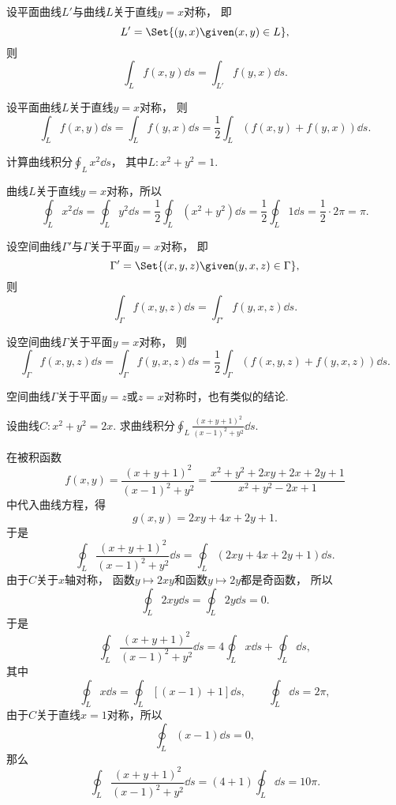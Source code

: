 
设平面曲线\(L'\)与曲线\(L\)关于直线\(y=x\)对称，
即\[
	L' = \Set{ (y,x) \given (x,y) \in L },
\]
则\[
	\int_L f(x,y) \dd{s}
	= \int_{L'} f(y,x) \dd{s}.
\]

设平面曲线\(L\)关于直线\(y=x\)对称，
则\[
	\int_L f(x,y) \dd{s}
	= \int_L f(y,x) \dd{s}
	= \frac12 \int_L (f(x,y) + f(y,x)) \dd{s}.
\]

\begin{example}
计算曲线积分\(\oint_L x^2 \dd{s}\)，
其中\(L: x^2+y^2=1\).
\begin{solution}
曲线\(L\)关于直线\(y=x\)对称，所以\[
	\oint_L x^2 \dd{s}
	= \oint_L y^2 \dd{s}
	= \frac12 \oint_L (x^2+y^2) \dd{s}
	= \frac12 \oint_L 1 \dd{s}
	= \frac12 \cdot 2\pi
	= \pi.
\]
\end{solution}
\end{example}

设空间曲线\(\Gamma'\)与\(\Gamma\)关于平面\(y=x\)对称，
即\[
	\Gamma' = \Set{ (x,y,z) \given (y,x,z) \in \Gamma },
\]
则\[
	\int_\Gamma f(x,y,z) \dd{s}
	= \int_{\Gamma'} f(y,x,z) \dd{s}.
\]

设空间曲线\(\Gamma\)关于平面\(y=x\)对称，
则\[
	\int_\Gamma f(x,y,z) \dd{s}
	= \int_\Gamma f(y,x,z) \dd{s}
	= \frac12 \int_\Gamma (f(x,y,z) + f(y,x,z)) \dd{s}.
\]

空间曲线\(\Gamma\)关于平面\(y=z\)或\(z=x\)对称时，也有类似的结论.

\begin{example}
设曲线\(C: x^2+y^2=2x\).
求曲线积分\(\oint_L \frac{(x+y+1)^2}{(x-1)^2+y^2} \dd{s}\).
\begin{solution}
在被积函数\[
	f(x,y) = \frac{(x+y+1)^2}{(x-1)^2+y^2}
	= \frac{x^2+y^2+2xy+2x+2y+1}{x^2+y^2-2x+1}
\]中代入曲线方程，得\[
	g(x,y) = 2xy+4x+2y+1.
\]
于是\[
	\oint_L \frac{(x+y+1)^2}{(x-1)^2+y^2} \dd{s}
	= \oint_L (2xy+4x+2y+1) \dd{s}.
\]
由于\(C\)关于\(x\)轴对称，
函数\(y \mapsto 2xy\)和函数\(y \mapsto 2y\)都是奇函数，
所以\[
	\oint_L 2xy \dd{s}
	= \oint_L 2y \dd{s}
	= 0.
\]
于是\[
	\oint_L \frac{(x+y+1)^2}{(x-1)^2+y^2} \dd{s}
	= 4 \oint_L x \dd{s} + \oint_L \dd{s},
\]
其中\[
	\oint_L x \dd{s}
	= \oint_L [(x-1)+1] \dd{s},
	\qquad
	\oint_L \dd{s}
	= 2\pi,
\]
由于\(C\)关于直线\(x=1\)对称，所以\[
	\oint_L (x-1) \dd{s}
	= 0,
\]
那么\[
	\oint_L \frac{(x+y+1)^2}{(x-1)^2+y^2} \dd{s}
	= (4+1) \oint_L \dd{s}
	= 10\pi.
\]
\end{solution}
\end{example}
